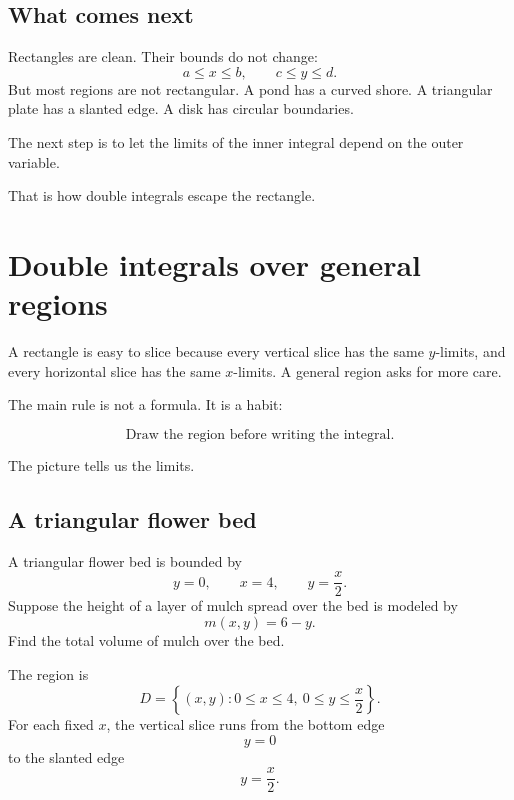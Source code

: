 \subsection{What comes next}

Rectangles are clean.  Their bounds do not change:
\[
    a\le x\le b,
    \qquad
    c\le y\le d.
\]
But most regions are not rectangular.  A pond has a curved shore.  A triangular plate has
a slanted edge.  A disk has circular boundaries.

The next step is to let the limits of the inner integral depend on the outer variable.

That is how double integrals escape the rectangle.

\section{Double integrals over general regions}
\label{sec:10.4}

A rectangle is easy to slice because every vertical slice has the same \(y\)-limits, and
every horizontal slice has the same \(x\)-limits.  A general region asks for more care.

The main rule is not a formula.  It is a habit:

\[
\boxed{
    \text{Draw the region before writing the integral.}
}
\]

The picture tells us the limits.

\subsection{A triangular flower bed}

A triangular flower bed is bounded by
\[
    y=0,
    \qquad
    x=4,
    \qquad
    y=\frac{x}{2}.
\]
Suppose the height of a layer of mulch spread over the bed is modeled by
\[
    m(x,y)=6-y.
\]
Find the total volume of mulch over the bed.

The region is
\[
    D=\left\{(x,y):0\le x\le4,\ 0\le y\le \frac{x}{2}\right\}.
\]
For each fixed \(x\), the vertical slice runs from the bottom edge
\[
    y=0
\]
to the slanted edge
\[
    y=\frac{x}{2}.
\]

